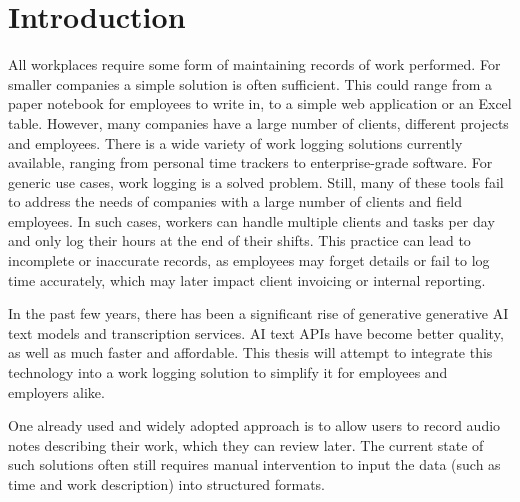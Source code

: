 \documentclass[
  digital,     %
  oneside,     %
  nosansbold,  %
  nocolorbold, %
  lof,         %
  lot,         %
]{fithesis4}
\begin{document}
\lstlistoflistings 
\printnoidxglossary[type=\acronymtype, title=List of Abbreviations]
\chapter*{Introduction}
All workplaces require some form of maintaining records of work performed. For smaller companies a simple solution is often sufficient. This could range from a paper notebook for employees to write in, to a simple web application or an Excel table. However, many companies have a large number of clients, different projects and employees. There is a wide variety of work logging solutions currently available, ranging from personal time trackers to enterprise-grade software. For generic use cases, work logging is a solved problem. Still, many of these tools fail to address the needs of companies with a large number of clients and field employees. In such cases, workers can handle multiple clients and tasks per day and only log their hours at the end of their shifts. This practice can lead to incomplete or inaccurate records, as employees may forget details or fail to log time accurately, which may later impact client invoicing or internal reporting.

In the past few years, there has been a significant rise of generative generative \gls{AI} text models and transcription services. \gls{AI} text \acrshort{API}s have become better quality, as well as much faster and affordable. This thesis will attempt to integrate this technology into a work logging solution to simplify it for employees and employers alike.

One already used and widely adopted approach is to allow users to record audio notes describing their work, which they can review later. The current state of such solutions often still requires manual intervention to input the data (such as time and work description) into structured formats.
\end{document}
